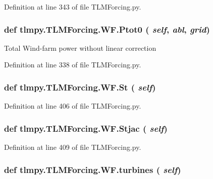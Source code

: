 Definition at line 343 of file TLMForcing.py.\hypertarget{classtlmpy_1_1TLMForcing_1_1WF_ad757b68a8ceb15bfece810edba434e00}{
\subsubsection[{Ptot0}]{\setlength{\rightskip}{0pt plus 5cm}def tlmpy.TLMForcing.WF.Ptot0 ( {\em self}, \/   {\em abl}, \/   {\em grid})}}
\label{classtlmpy_1_1TLMForcing_1_1WF_ad757b68a8ceb15bfece810edba434e00}
\begin{DoxyVerb}Total Wind-farm power without linear correction\end{DoxyVerb}
 

Definition at line 338 of file TLMForcing.py.\hypertarget{classtlmpy_1_1TLMForcing_1_1WF_a0f90383fde87421cf03fe3aba6fc8375}{
\subsubsection[{St}]{\setlength{\rightskip}{0pt plus 5cm}def tlmpy.TLMForcing.WF.St ( {\em self})}}
\label{classtlmpy_1_1TLMForcing_1_1WF_a0f90383fde87421cf03fe3aba6fc8375}


Definition at line 406 of file TLMForcing.py.\hypertarget{classtlmpy_1_1TLMForcing_1_1WF_a2790abe7cdb78755d03e3c4117b78cfc}{
\subsubsection[{Stjac}]{\setlength{\rightskip}{0pt plus 5cm}def tlmpy.TLMForcing.WF.Stjac ( {\em self})}}
\label{classtlmpy_1_1TLMForcing_1_1WF_a2790abe7cdb78755d03e3c4117b78cfc}


Definition at line 409 of file TLMForcing.py.\hypertarget{classtlmpy_1_1TLMForcing_1_1WF_a38d2d9d59ab1e05c7be26a14a5177552}{
\subsubsection[{turbines}]{\setlength{\rightskip}{0pt plus 5cm}def tlmpy.TLMForcing.WF.turbines ( {\em self})}}
\label{classtlmpy_1_1TLMForcing_1_1WF_a38d2d9d59ab1e05c7be26a14a5177552}


